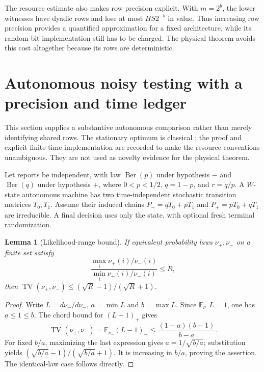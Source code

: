 \documentclass[11pt]{amsart}
\newtheorem{lemma}[theorem]{Lemma}
\theoremstyle{definition}\newtheorem{definition}[theorem]{Definition}
\theoremstyle{remark}\newtheorem{remark}[theorem]{Remark}
\newcommand{\TV}{\operatorname{TV}}
\newcommand{\Ber}{\operatorname{Ber}}
\newcommand{\E}{\mathbb E}
\newcommand{\1}{\mathbf 1}
\begin{document}
The resource estimate also makes row precision explicit. With $m=2^b$,
the lower witnesses have dyadic rows and lose at most $HS2^{-b}$ in value.
Thus increasing row precision provides a quantified approximation for a
fixed architecture, while its random-bit implementation still has to be
charged. The physical theorem avoids this cost altogether because its
rows are deterministic.

\section{Autonomous noisy testing with a precision and time ledger}
\label{sec:autonomous}
This section supplies a substantive autonomous comparison rather than
merely identifying shared rows. The stationary optimum is classical
\cite{HC}; the proof and explicit finite-time implementation are recorded
to make the resource conventions unambiguous. They are not used as
novelty evidence for the physical theorem.

Let reports be independent, with law $\Ber(p)$ under hypothesis $-$ and
$\Ber(q)$ under hypothesis $+$, where $0<p<1/2$, $q=1-p$, and $r=q/p$.
A $W$-state autonomous machine has two time-independent stochastic
transition matrices $T_0,T_1$. Assume their induced chains
$P_-=qT_0+pT_1$ and $P_+=pT_0+qT_1$ are irreducible. A final decision
uses only the state, with optional fresh terminal randomization.

\begin{lemma}[Likelihood-range bound]\label{lem:range}
If equivalent probability laws $\nu_+,\nu_-$ on a finite set satisfy
\[
 \frac{\max_i\nu_+(i)/\nu_-(i)}
      {\min_i\nu_+(i)/\nu_-(i)}\le R,
\]
then $\TV(\nu_+,\nu_-)\le(\sqrt R-1)/(\sqrt R+1)$.
\end{lemma}
\begin{proof}
Write $L=d\nu_+/d\nu_-$, $a=\min L$ and $b=\max L$.
Since $\E_{\nu_-}L=1$, one has $a\le1\le b$. The chord bound for
$(L-1)_+$ gives
\[
 \TV(\nu_+,\nu_-)=\E_{\nu_-}(L-1)_+
 \le\frac{(1-a)(b-1)}{b-a}.
\]
For fixed $b/a$, maximizing the last expression gives $a=1/\sqrt{b/a}$;
substitution yields $(\sqrt{b/a}-1)/(\sqrt{b/a}+1)$. It is increasing
in $b/a$, proving the assertion. The identical-law case follows directly.
\end{proof}
\end{document}
